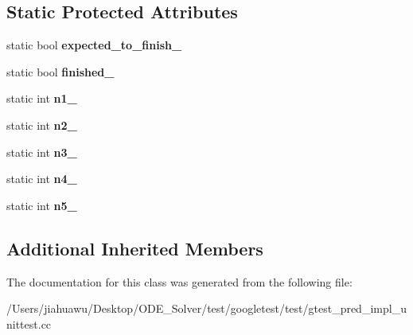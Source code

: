 \subsection*{Static Protected Attributes}
\begin{DoxyCompactItemize}
\item 
\mbox{\label{class_predicate5_test_aa502b7a330cc5c64785ff59aad3ef180}} 
static bool {\bfseries expected\+\_\+to\+\_\+finish\+\_\+}
\item 
\mbox{\label{class_predicate5_test_a5003aada64accf06cdb28b1ff1797353}} 
static bool {\bfseries finished\+\_\+}
\item 
\mbox{\label{class_predicate5_test_a356c8e361185b234a417ed895eb14e38}} 
static int {\bfseries n1\+\_\+}
\item 
\mbox{\label{class_predicate5_test_a5bf48ba65b7baf20abe1d2af90779ce0}} 
static int {\bfseries n2\+\_\+}
\item 
\mbox{\label{class_predicate5_test_a63723efb915dbf418c31b97b64dabc0e}} 
static int {\bfseries n3\+\_\+}
\item 
\mbox{\label{class_predicate5_test_a5d66aa58badddc8d3d8070a93c0558d6}} 
static int {\bfseries n4\+\_\+}
\item 
\mbox{\label{class_predicate5_test_a96badba6366235a2771b27ea014bd9ce}} 
static int {\bfseries n5\+\_\+}
\end{DoxyCompactItemize}
\subsection*{Additional Inherited Members}


The documentation for this class was generated from the following file\+:\begin{DoxyCompactItemize}
\item 
/\+Users/jiahuawu/\+Desktop/\+O\+D\+E\+\_\+\+Solver/test/googletest/test/gtest\+\_\+pred\+\_\+impl\+\_\+unittest.\+cc\end{DoxyCompactItemize}

